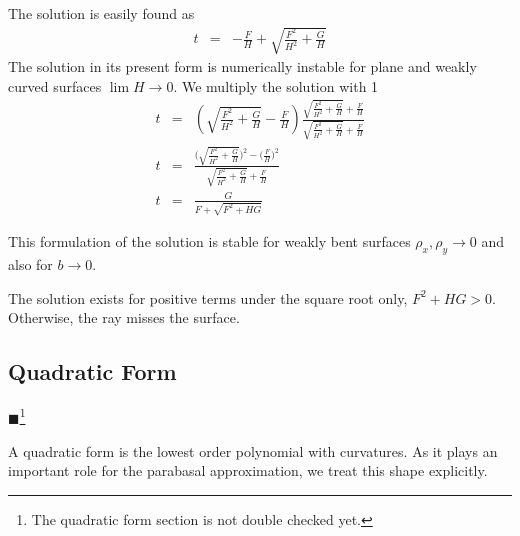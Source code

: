 \documentclass[12pt,a4paper,twoside,openright,BCOR10mm,headsepline,titlepage,abstracton,chapterprefix,final]{scrreprt}
\newcommand{\remark}[1]{{\color{red}$\blacksquare$}\footnote{{\color{red}#1}}}
\begin{document}
The solution is easily found as
\begin{eqnarray}
  t &=& - \frac{F}{H} + \sqrt{\frac{F^2}{H^2} + \frac{G}{H}}
\end{eqnarray}
The solution in its present form is numerically instable for plane and weakly curved surfaces $\lim H \rightarrow 0$.
We multiply the solution with 1
\begin{eqnarray}
  t &=&  \left( \sqrt{\frac{F^2}{H^2} + \frac{G}{H}} - \frac{F}{H} \right) \frac{\sqrt{\frac{F^2}{H^2} + \frac{G}{H}} + \frac{F}{H}}{\sqrt{\frac{F^2}{H^2} + \frac{G}{H}} + \frac{F}{H}} \\
  t &=&  \frac{ \bigg( \sqrt{\frac{F^2}{H^2} + \frac{G}{H}} \bigg)^2 - \bigg( \frac{F}{H} \bigg)^2 }{\sqrt{\frac{F^2}{H^2} + \frac{G}{H}} + \frac{F}{H}} \\
  t &=& \frac{G}{ F + \sqrt{F^2 + H G} }
\end{eqnarray}

This formulation of the solution is stable for weakly bent surfaces $\rho_x, \rho_y \rightarrow 0$ and also for $b \rightarrow 0$.

The solution exists for positive terms under the square root only, $F^2 + H G > 0$. 
Otherwise, the ray misses the surface.


\subsection{Quadratic Form}
\remark{The quadratic form section is not double checked yet.}

A quadratic form is the lowest order polynomial with curvatures.
As it plays an important role for the parabasal approximation, we treat this shape explicitly.
\end{document}
